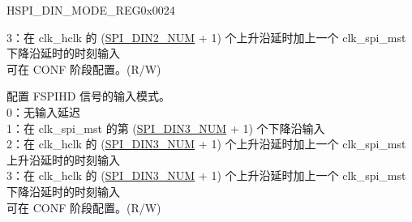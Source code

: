 \begin{register}{H}{SPI\_DIN\_MODE\_REG}{0x0024}
\begin{regdesc}
\begin{reglist}
3：在 clk\_hclk 的 (\hyperref[fielddesc:SPIDIN2NUM]{SPI\_DIN2\_NUM} + 1) 个上升沿延时加上一个 clk\_spi\_mst 下降沿延时的时刻输入\\
可在 CONF 阶段配置。(R/W)
\label{fielddesc:SPIDIN3MODE}\item [SPI\_DIN3\_MODE] 配置 FSPIHD 信号的输入模式。\\
0：无输入延迟\\
1：在 clk\_spi\_mst 的第 (\hyperref[fielddesc:SPIDIN3NUM]{SPI\_DIN3\_NUM} + 1) 个下降沿输入\\
2：在 clk\_hclk 的 (\hyperref[fielddesc:SPIDIN3NUM]{SPI\_DIN3\_NUM} + 1) 个上升沿延时加上一个 clk\_spi\_mst 上升沿延时的时刻输入\\
3：在 clk\_hclk 的 (\hyperref[fielddesc:SPIDIN3NUM]{SPI\_DIN3\_NUM} + 1) 个上升沿延时加上一个 clk\_spi\_mst 下降沿延时的时刻输入\\
可在 CONF 阶段配置。(R/W)

\item [见下页]
\end{reglist}\end{regdesc}
\end{register}

